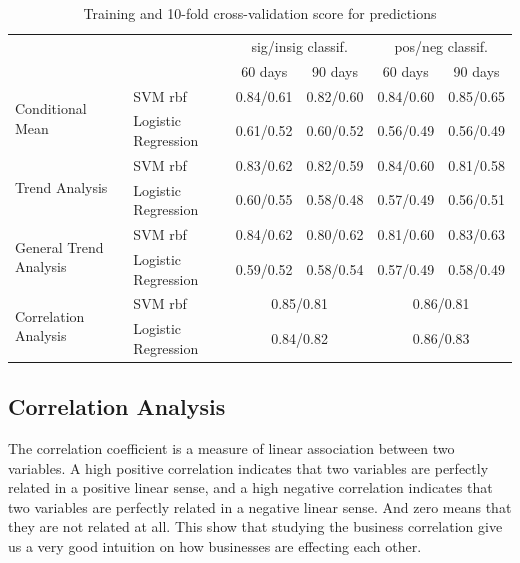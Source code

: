 \documentclass{vldb}
\begin{document}
\begin{table}[ht!]
\centering
\begin{tabular}{@{}llrrrr@{}}
\toprule
                                                              &                     & \multicolumn{2}{c}{sig/insig classif.} & \multicolumn{2}{c}{pos/neg classif.} \\ 
\cmidrule(r){3-4}
\cmidrule(r){5-6}
                                                              &                     & \multicolumn{1}{c}{60 days} & \multicolumn{1}{c}{90 days} & \multicolumn{1}{c}{60 days} & \multicolumn{1}{c}{90 days} \\ \midrule
\multirow{2}{*}{Conditional Mean}  & SVM rbf             &   0.84/0.61   &  0.82/0.60  & 0.84/0.60 &  0.85/0.65  \\
                                        & Logistic Regression & 0.61/0.52  & 0.60/0.52 &  0.56/0.49   &  0.56/0.49   \\ \midrule
\multirow{2}{*}{Trend Analysis}       & SVM rbf             & 0.83/0.62    &  0.82/0.59 & 0.84/0.60 & 0.81/0.58   \\
                                        & Logistic Regression &  0.60/0.55   & 0.58/0.48 &  0.57/0.49  &  0.56/0.51   \\ \midrule
\multirow{2}{*}{General Trend Analysis} & SVM rbf             & 0.84/0.62 & 0.80/0.62 &  0.81/0.60 &  0.83/0.63  \\
                                       & Logistic Regression &  0.59/0.52  & 0.58/0.54  &   0.57/0.49  &   0.58/0.49       \\ \midrule
\multirow{2}{*}{Correlation Analysis}   & SVM rbf             & \multicolumn{2}{c}{0.85/0.81}  & \multicolumn{2}{c}{0.86/0.81} \\
                                        & Logistic Regression & \multicolumn{2}{c}{0.84/0.82}  & \multicolumn{2}{c}{0.86/0.83} \\
\bottomrule
\end{tabular}
\caption{Training and 10-fold cross-validation score for predictions}
\label{tab:results}
\end{table}

\subsection*{Correlation Analysis}
The correlation coefficient is a measure of linear association between two variables. A high positive correlation indicates that two variables are perfectly related in a positive linear sense, and a high negative correlation indicates that two variables are perfectly related in a negative linear sense. And zero means that they are not related at all. This show that studying the business correlation give us a very good intuition on how businesses are effecting each other. 
\end{document}

